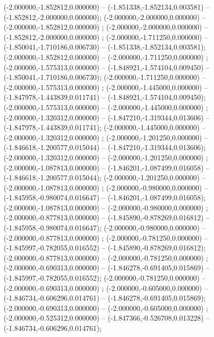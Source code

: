  (-2.000000,-1.852812,0.000000) -- (-1.851338,-1.852134,0.003581) -- (-1.852812,-2.000000,0.000000);
 (-2.000000,-2.000000,0.000000) -- (-2.000000,-1.852812,0.000000) ;
 (-2.000000,-2.000000,0.000000) -- (-1.852812,-2.000000,0.000000) ;
 (-2.000000,-1.711250,0.000000) -- (-1.850041,-1.710186,0.006730) -- (-1.851338,-1.852134,0.003581);
 (-2.000000,-1.852812,0.000000) -- (-2.000000,-1.711250,0.000000) ;
 (-2.000000,-1.575313,0.000000) -- (-1.848921,-1.574104,0.009450) -- (-1.850041,-1.710186,0.006730);
 (-2.000000,-1.711250,0.000000) -- (-2.000000,-1.575313,0.000000) ;
 (-2.000000,-1.445000,0.000000) -- (-1.847978,-1.443839,0.011741) -- (-1.848921,-1.574104,0.009450);
 (-2.000000,-1.575313,0.000000) -- (-2.000000,-1.445000,0.000000) ;
 (-2.000000,-1.320312,0.000000) -- (-1.847210,-1.319344,0.013606) -- (-1.847978,-1.443839,0.011741);
 (-2.000000,-1.445000,0.000000) -- (-2.000000,-1.320312,0.000000) ;
 (-2.000000,-1.201250,0.000000) -- (-1.846618,-1.200577,0.015044) -- (-1.847210,-1.319344,0.013606);
 (-2.000000,-1.320312,0.000000) -- (-2.000000,-1.201250,0.000000) ;
 (-2.000000,-1.087813,0.000000) -- (-1.846201,-1.087499,0.016058) -- (-1.846618,-1.200577,0.015044);
 (-2.000000,-1.201250,0.000000) -- (-2.000000,-1.087813,0.000000) ;
 (-2.000000,-0.980000,0.000000) -- (-1.845958,-0.980074,0.016647) -- (-1.846201,-1.087499,0.016058);
 (-2.000000,-1.087813,0.000000) -- (-2.000000,-0.980000,0.000000) ;
 (-2.000000,-0.877813,0.000000) -- (-1.845890,-0.878269,0.016812) -- (-1.845958,-0.980074,0.016647);
 (-2.000000,-0.980000,0.000000) -- (-2.000000,-0.877813,0.000000) ;
 (-2.000000,-0.781250,0.000000) -- (-1.845997,-0.782055,0.016552) -- (-1.845890,-0.878269,0.016812);
 (-2.000000,-0.877813,0.000000) -- (-2.000000,-0.781250,0.000000) ;
 (-2.000000,-0.690313,0.000000) -- (-1.846278,-0.691405,0.015869) -- (-1.845997,-0.782055,0.016552);
 (-2.000000,-0.781250,0.000000) -- (-2.000000,-0.690313,0.000000) ;
 (-2.000000,-0.605000,0.000000) -- (-1.846734,-0.606296,0.014761) -- (-1.846278,-0.691405,0.015869);
 (-2.000000,-0.690313,0.000000) -- (-2.000000,-0.605000,0.000000) ;
 (-2.000000,-0.525312,0.000000) -- (-1.847366,-0.526708,0.013228) -- (-1.846734,-0.606296,0.014761);

